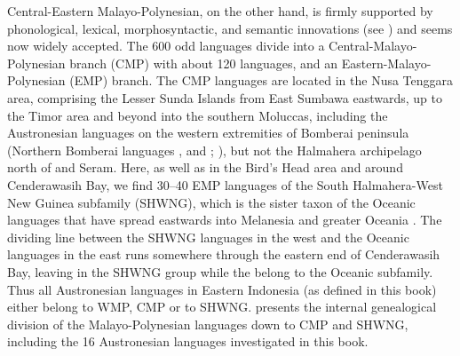 Central-Eastern Malayo-Polynesian, on the other hand, is firmly supported by phonological, lexical, morphosyntactic, and semantic innovations (see \citealt{blust1993central}) and seems now widely accepted. The 600 odd languages divide into a Central-Malayo-Poly\-ne\-sian branch (CMP) with about 120 languages, and an Eastern-Malayo-Polynesian (EMP) branch. The CMP languages are located in the Nusa Tenggara area, comprising the Lesser Sunda Islands from East Sumbawa eastwards, up to the Timor area and beyond into the southern Moluccas, including the Austronesian languages on the western extremities of Bomberai peninsula (Northern Bomberai languages ,  and ; \citealt[24]{adelaar2005austronesian}), but not the Halmahera archipelago north of  and Seram. Here, as well as in the Bird's Head area and around Cenderawasih Bay, we find 30--40 EMP languages of the South Halmahera-West New Guinea subfamily (SHWNG), which is the sister taxon of the Oceanic languages that have spread eastwards into Melanesia and greater Oceania \citep{blust2009austronesian}. The dividing line between the SHWNG languages in the west and the Oceanic languages in the east runs somewhere through the eastern end of Cenderawasih Bay, leaving  in the SHWNG group while the  belong to the Oceanic subfamily. Thus all Austronesian languages in Eastern Indonesia (as defined in this book) either belong to WMP, CMP or to SHWNG.  presents the internal genealogical division of the Malayo-Polynesian languages down to CMP and SHWNG, including the 16 Austronesian languages investigated in this book.



